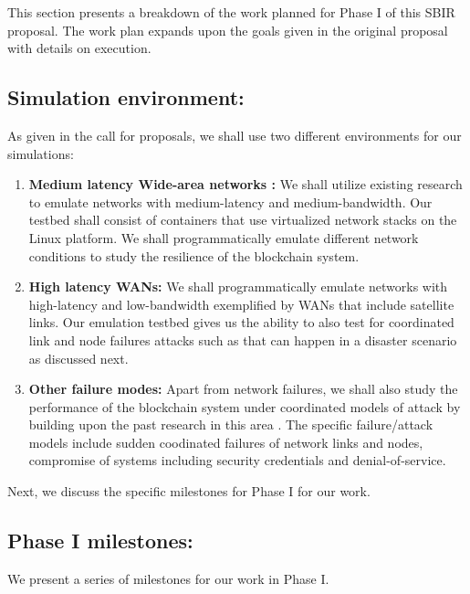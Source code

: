 \label{sec:plan}
This section presents a breakdown of the work planned for Phase I of this SBIR proposal. The work plan expands upon the
goals given in the original proposal with details on execution. 

\subsection{Simulation environment:}

As given in the call for proposals, we shall use two different environments for our simulations:

\begin{enumerate}
    \item {\bf Medium latency Wide-area networks :} We shall utilize existing research \cite{gustaf2013, haq2017}
to emulate networks with medium-latency and medium-bandwidth. Our testbed shall consist of 
containers that use virtualized network stacks on the Linux platform. We shall programmatically
emulate different network conditions to study the resilience of the blockchain system.

\item {\bf High latency WANs:}  We shall programmatically emulate networks with high-latency and low-bandwidth
exemplified by WANs that include satellite links. Our emulation testbed gives us the ability to also test for
coordinated link and node failures attacks such as that can happen in a disaster scenario as discussed next.
 
\item {\bf Other failure modes:} Apart from network failures, we shall also study the performance of the blockchain
system under coordinated models of attack by building upon the past research in this area \cite{xiao2006, niu2017,
kurar2014, zhou2010}. The specific failure/attack models include sudden coodinated failures of network links and nodes,
compromise of systems including security credentials and denial-of-service.

\end{enumerate}

Next, we discuss the specific milestones for Phase I for our work. 

\subsection{Phase I milestones:}

We present a series of milestones for our work in Phase I. 

